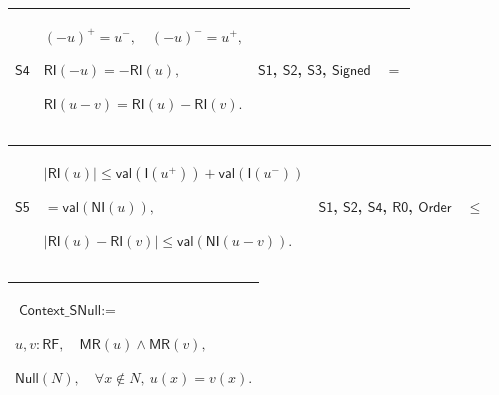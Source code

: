 \documentclass[11pt]{amsart}
\newlength{\FTCOneColumnBody}
\newlength{\FTCFourColumnBody}
\begin{document}
{\noindent
\begin{tabular}{|@{}>{\centering\arraybackslash}m{0.078431\FTCFourColumnBody}|>{\centering\arraybackslash}m{0.535947\FTCFourColumnBody}|>{\centering\arraybackslash}m{0.281045\FTCFourColumnBody}|>{\centering\arraybackslash}m{0.104575\FTCFourColumnBody}|}\hline
\hypertarget{dct:S4}{$\displaystyle \textsf{S4}$} & $\displaystyle (-u)^+=u^-,\quad(-u)^-=u^+,$\par
$\displaystyle \textsf{RI}(-u)=-\textsf{RI}(u),$\par
$\displaystyle \textsf{RI}(u-v)=\textsf{RI}(u)-\textsf{RI}(v).$ & \hyperlink{dct:S1}{$\displaystyle \textsf{S1}$}, \hyperlink{dct:S2}{$\displaystyle \textsf{S2}$}, \hyperlink{dct:S3}{$\displaystyle \textsf{S3}$}, \hyperlink{dctdef:Signed}{$\displaystyle \textsf{Signed}$} & $\displaystyle =$\\ \hline
\end{tabular}%
\par\setlength{\parskip}{0pt}\nointerlineskip
\noindent
\begin{tabular}{|@{}>{\centering\arraybackslash}m{0.078431\FTCFourColumnBody}|>{\centering\arraybackslash}m{0.535947\FTCFourColumnBody}|>{\centering\arraybackslash}m{0.281045\FTCFourColumnBody}|>{\centering\arraybackslash}m{0.104575\FTCFourColumnBody}|}\hline
\hypertarget{dct:S5}{$\displaystyle \textsf{S5}$} & $\displaystyle |\textsf{RI}(u)|\le\textsf{val}(\textsf{I}(u^+))+\textsf{val}(\textsf{I}(u^-))$\par
$\displaystyle {}=\textsf{val}(\textsf{NI}(u)),$\par
$\displaystyle |\textsf{RI}(u)-\textsf{RI}(v)|\le\textsf{val}(\textsf{NI}(u-v)).$ & \hyperlink{dct:S1}{$\displaystyle \textsf{S1}$}, \hyperlink{dct:S2}{$\displaystyle \textsf{S2}$}, \hyperlink{dct:S4}{$\displaystyle \textsf{S4}$}, \hyperlink{dct:R0}{$\displaystyle \textsf{R0}$}, \hyperlink{ax:Order}{$\displaystyle \textsf{Order}$} & $\displaystyle \le$\\ \hline
\end{tabular}%
\par\setlength{\parskip}{0pt}\nointerlineskip
\noindent
\begin{tabular}{|@{}>{\centering\arraybackslash}m{\FTCOneColumnBody}|}\hline
$\displaystyle \textsf{Context\_SNull}:=$\par
$\displaystyle u,v:\textsf{RF},\quad\textsf{MR}(u)\land\textsf{MR}(v),$\par
$\displaystyle \textsf{Null}(N),\quad\forall x\notin N,\ u(x)=v(x).$\\ \hline

\end{tabular}}
\end{document}
